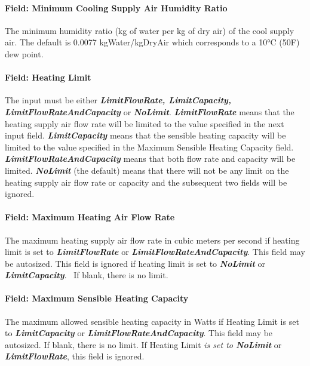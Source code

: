 \paragraph{Field: Minimum Cooling Supply Air Humidity Ratio}\label{field-minimum-cooling-supply-air-humidity-ratio-000}

The minimum humidity ratio (kg of water per kg of dry air) of the cool supply air. The default is 0.0077 kgWater/kgDryAir which corresponds to a 10\si{\degreeCelsius} (50F) dew point.

\paragraph{Field: Heating Limit}\label{field-heating-limit-000}

The input must be either \textbf{\emph{LimitFlowRate, LimitCapacity, LimitFlowRateAndCapacity}} or \textbf{\emph{NoLimit}}. \textbf{\emph{LimitFlowRate}} means that the heating supply air flow rate will be limited to the value specified in the next input field. \textbf{\emph{LimitCapacity}} means that the sensible heating capacity will be limited to the value specified in the Maximum Sensible Heating Capacity field. \textbf{\emph{LimitFlowRateAndCapacity}} means that both flow rate and capacity will be limited. \textbf{\emph{NoLimit}} (the default) means that there will not be any limit on the heating supply air flow rate or capacity and the subsequent two fields will be ignored.

\paragraph{Field: Maximum Heating Air Flow Rate}\label{field-maximum-heating-air-flow-rate-001}

The maximum heating supply air flow rate in cubic meters per second if heating limit is set to \textbf{\emph{LimitFlowRate}} or \textbf{\emph{LimitFlowRateAndCapacity}}. This field may be autosized. This field is ignored if heating limit is set to \textbf{\emph{NoLimit}} or \textbf{\emph{LimitCapacity}}.~ If blank, there is no limit.

\paragraph{Field: Maximum Sensible Heating Capacity}\label{field-maximum-sensible-heating-capacity-000}

The maximum allowed sensible heating capacity in Watts if Heating Limit is set to \textbf{\emph{LimitCapacity}} or \textbf{\emph{LimitFlowRateAndCapacity}}. This field may be autosized. If blank, there is no limit. If Heating Limit \emph{is set to \textbf{NoLimit}} or \textbf{\emph{LimitFlowRate}}, this field is ignored.

